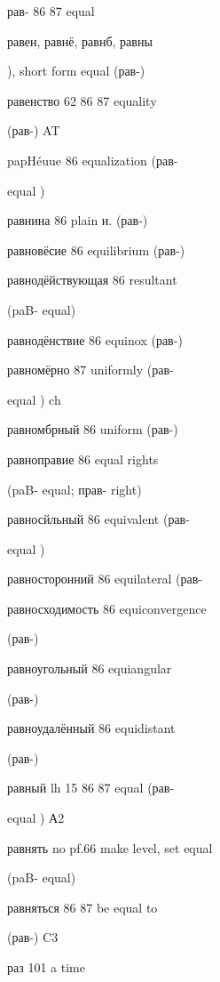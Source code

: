 \begin{minipage}[t]{0.475\textwidth}
\raggedright
\noindent рав- 86 87 equal\par
\noindent равен, равнё, равнб, равны\par
\noindent ), short form equal (рав-)\par
\noindent равенство 62 86 87 equality\par
\noindent (рав-) AT\par
\noindent papHéuue 86 equalization (рав-\par
\noindent equal )\par
\noindent равнина 86 plain и. (рав-)\par
\noindent равновёсие 86 equilibrium (рав-)\par
\noindent равнодёйствующая 86 resultant\par
\noindent (paB- equal)\par
\noindent равнодёнствие 86 equinox (рав-)\par
\noindent равномёрно 87 uniformly (рав-\par
\noindent equal ) ch\par
\noindent равномбрный 86 uniform (рав-)\par
\noindent равноправие 86 equal rights\par
\noindent (paB- equal; прав- right)\par
\noindent равносйльный 86 equivalent (рав-\par
\noindent equal )\par
\noindent равносторонний 86 equilateral (рав-\par
\noindent равносходимость 86 equiconvergence\par
\noindent (рав-)\par
\noindent равноугольный 86 equiangular\par
\noindent (рав-)\par
\noindent равноудалённый 86 equidistant\par
\noindent (рав-)\par
\noindent равный lh 15 86 87 equal (рав-\par
\noindent equal ) А2\par
\noindent равнять no pf.66 make level, set equal\par
\noindent (paB- equal)\par
\noindent равняться 86 87 be equal to\par
\noindent (рав-) C3\par
\noindent раз 101 a time\par

\end{minipage}
